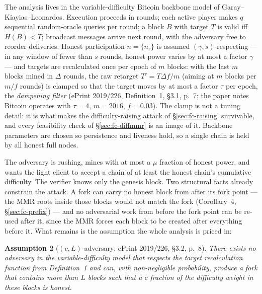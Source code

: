 \documentclass[11pt,a4paper]{article}
\theoremstyle{definition}
\begin{document}
The analysis lives in the variable-difficulty Bitcoin backbone model of
Garay--Kiayias--Leonardos. Execution proceeds in rounds; each active player
makes $q$ sequential random-oracle queries per round; a block $B$ with
target $T$ is valid iff $H(B) < T$; broadcast messages arrive next round,
with the adversary free to reorder deliveries. Honest participation
$n = \{n_r\}$ is assumed $(\gamma, s)$-respecting --- in any window of
fewer than $s$ rounds, honest power varies by at most a factor $\gamma$ ---
and targets are recalculated once per epoch of $m$ blocks: with the last
$m$ blocks mined in $\Delta$ rounds, the raw retarget $T' = T\Delta f/m$
(aiming at $m$ blocks per $m/f$ rounds) is clamped so that the target moves
by at most a factor $\tau$ per epoch, the \emph{dampening filter} (ePrint
2019/226, Definition~1, \S3.1, p.~7; the paper notes Bitcoin operates with
$\tau = 4$, $m = 2016$, $f = 0.03$). The clamp is not a tuning detail: it
is what makes the difficulty-raising attack of \S\ref{sec:fc-raising}
survivable, and every feasibility check of \S\ref{sec:fc-diffmmr} is an
image of it. Backbone parameters are chosen so persistence and liveness
hold, so a single chain is held by all honest full nodes.

The adversary is rushing, mines with at most a $\mu$ fraction of honest
power, and wants the light client to accept a chain of at least the honest
chain's cumulative difficulty. The verifier knows only the genesis block.
Two structural facts already constrain the attack. A fork can carry no
honest block from after its fork point --- the MMR roots inside those
blocks would not match the fork (Corollary~4, \S\ref{sec:fc-prefix}) ---
and no adversarial work from before the fork point can be re-used after
it, since the MMR forces each block to be created after everything before
it. What remains is the assumption the whole analysis is priced in:

\medskip
\noindent\textbf{Assumption 2} ($(c, L)$-adversary; ePrint 2019/226,
\S3.2, p.~8). \emph{There exists no adversary in the variable-difficulty
model that respects the target recalculation function from Definition~1
and can, with non-negligible probability, produce a fork that contains
more than $L$ blocks such that a $c$ fraction of the difficulty weight in
these blocks is honest.}
\medskip
\end{document}
